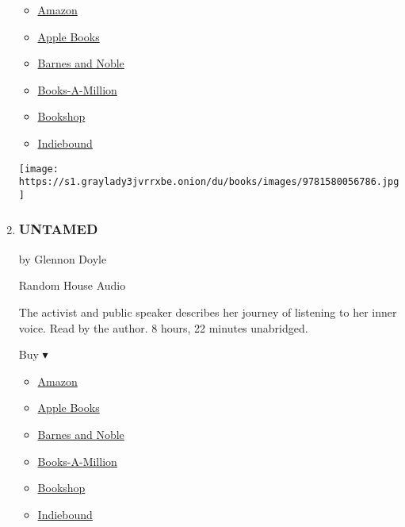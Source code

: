 \begin{enumerate}
  \begin{itemize}
  \tightlist
  \item
    \href{https://www.amazon.com/You-Want-Talk-About-Race-ebook/dp/B073P53DVL?tag=NYTBS-20}{Amazon}
  \item
    \href{https://du-gae-books-dot-nyt-du-prd.appspot.com/buy?title=SO+YOU+WANT+TO+TALK+ABOUT+RACE\&author=Ijeoma+Oluo}{Apple
    Books}
  \item
    \href{https://www.anrdoezrs.net/click-7990613-11819508?url=https\%3A\%2F\%2Fwww.barnesandnoble.com\%2Fw\%2F\%3Fean\%3D9781538475324}{Barnes
    and Noble}
  \item
    \href{https://www.anrdoezrs.net/click-7990613-35140?url=https\%3A\%2F\%2Fwww.booksamillion.com\%2Fp\%2FSO\%2BYOU\%2BWANT\%2BTO\%2BTALK\%2BABOUT\%2BRACE\%2FIjeoma\%2BOluo\%2F9781538475324}{Books-A-Million}
  \item
    \href{https://bookshop.org/a/3546/9781538475324}{Bookshop}
  \item
    \href{https://www.indiebound.org/book/9781538475324?aff=NYT}{Indiebound}
  \end{itemize}

  \texttt{[image: https://s1.graylady3jvrrxbe.onion/du/books/images/9781580056786.jpg]}
\item
  \hypertarget{untamed}{%
  \subsubsection{UNTAMED}\label{untamed}}

  by Glennon Doyle

  Random House Audio

  The activist and public speaker describes her journey of listening to
  her inner voice. Read by the author. 8 hours, 22 minutes unabridged.

  Buy ▾

  \begin{itemize}
  \tightlist
  \item
    \href{https://www.amazon.com/dp/1984801252?tag=NYTBSREV-20\&tag=NYTBS-20}{Amazon}
  \item
    \href{https://du-gae-books-dot-nyt-du-prd.appspot.com/buy?title=UNTAMED\&author=Glennon+Doyle}{Apple
    Books}
  \item
    \href{https://www.anrdoezrs.net/click-7990613-11819508?url=https\%3A\%2F\%2Fwww.barnesandnoble.com\%2Fw\%2F\%3Fean\%3D9780593156070}{Barnes
    and Noble}
  \item
    \href{https://www.anrdoezrs.net/click-7990613-35140?url=https\%3A\%2F\%2Fwww.booksamillion.com\%2Fp\%2FUNTAMED\%2FGlennon\%2BDoyle\%2F9780593156070}{Books-A-Million}
  \item
    \href{https://bookshop.org/a/3546/9780593156070}{Bookshop}
  \item
    \href{https://www.indiebound.org/book/9780593156070?aff=NYT}{Indiebound}
  \end{itemize}


\end{enumerate}
